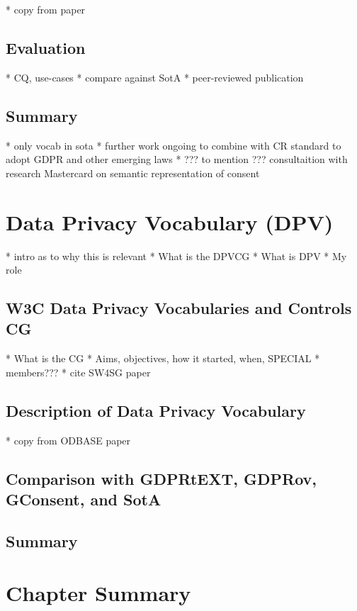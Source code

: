 * copy from paper

\subsection{Evaluation}

* CQ, use-cases
* compare against SotA
* peer-reviewed publication

\subsection*{Summary}

* only vocab in sota
* further work ongoing to combine with CR standard to adopt GDPR and other emerging laws
* ??? to mention ??? consultaition with research Mastercard on semantic representation of consent

\section{Data Privacy Vocabulary (DPV)}\label{sec:voc:DPV}

* intro as to why this is relevant
* What is the DPVCG
* What is DPV
* My role

\subsection{W3C Data Privacy Vocabularies and Controls CG}
* What is the CG
* Aims, objectives, how it started, when, SPECIAL
* members???
* cite SW4SG paper

\subsection{Description of Data Privacy Vocabulary}
* copy from ODBASE paper

\subsection{Comparison with GDPRtEXT, GDPRov, GConsent, and SotA}

\subsection*{Summary}

\section{Chapter Summary}
